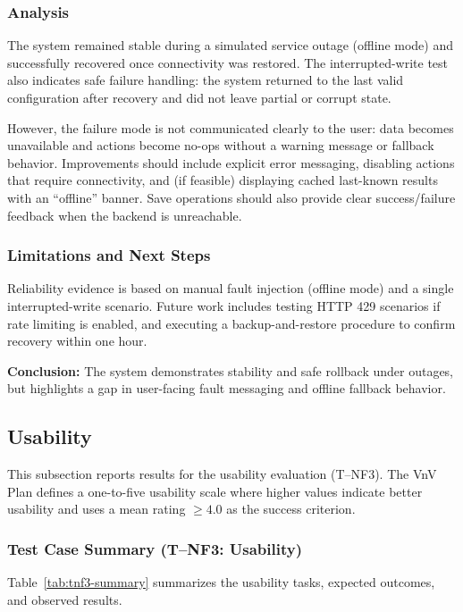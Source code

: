 \documentclass[12pt, titlepage]{article}
\begin{document}
\subsubsection{Analysis}
The system remained stable during a simulated service outage (offline mode) and
successfully recovered once connectivity was restored. The interrupted-write
test also indicates safe failure handling: the system returned to the last valid
configuration after recovery and did not leave partial or corrupt state.

However, the failure mode is not communicated clearly to the user: data becomes
unavailable and actions become no-ops without a warning message or fallback
behavior. Improvements should include explicit error messaging, disabling
actions that require connectivity, and (if feasible) displaying cached last-known
results with an ``offline'' banner. Save operations should also provide clear
success/failure feedback when the backend is unreachable.

\subsubsection{Limitations and Next Steps}
Reliability evidence is based on manual fault injection (offline
mode) and a single interrupted-write scenario. Future work includes
testing HTTP 429 scenarios if rate limiting is enabled, and executing
a backup-and-restore procedure to confirm recovery within one hour.

\noindent \textbf{Conclusion:} The system demonstrates stability and safe rollback
under outages, but highlights a gap in user-facing fault messaging and offline
fallback behavior.

\subsection{Usability}
\label{sec:nfr-usability}

This subsection reports results for the usability evaluation (T--NF3).
The VnV Plan defines a one-to-five usability scale where higher values
indicate better usability and uses a mean rating $\geq 4.0$ as the
success criterion.

\subsubsection{Test Case Summary (T--NF3: Usability)}
Table~\ref{tab:tnf3-summary} summarizes the usability tasks, expected outcomes, and observed results.
\end{document}
